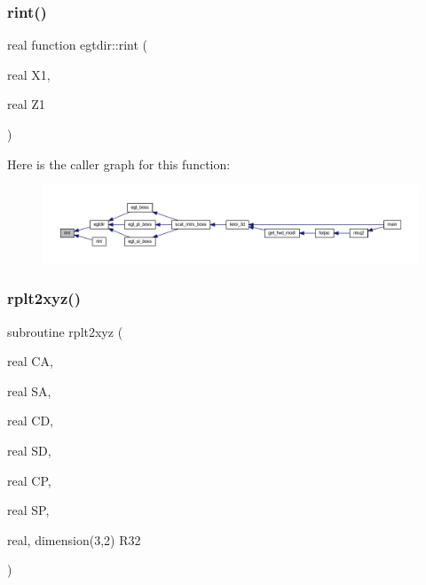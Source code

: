 \subsubsection{\texorpdfstring{rint()}{rint()}}
{\footnotesize\ttfamily real function egtdir\+::rint (\begin{DoxyParamCaption}\item[{real}]{X1,  }\item[{real}]{Z1 }\end{DoxyParamCaption})}

Here is the caller graph for this function\+:\nopagebreak
\begin{figure}[H]
\begin{center}
\leavevmode
\includegraphics[width=350pt]{Leroi_8f90_a175215729f915283d0b8fb5dec72eb0a_icgraph}
\end{center}
\end{figure}
\mbox{\label{Leroi_8f90_a8ec0c93946d1a3d78ce1cabd3de6558d}} 
\subsubsection{\texorpdfstring{rplt2xyz()}{rplt2xyz()}}
{\footnotesize\ttfamily subroutine rplt2xyz (\begin{DoxyParamCaption}\item[{real}]{CA,  }\item[{real}]{SA,  }\item[{real}]{CD,  }\item[{real}]{SD,  }\item[{real}]{CP,  }\item[{real}]{SP,  }\item[{real, dimension(3,2)}]{R32 }\end{DoxyParamCaption})}

